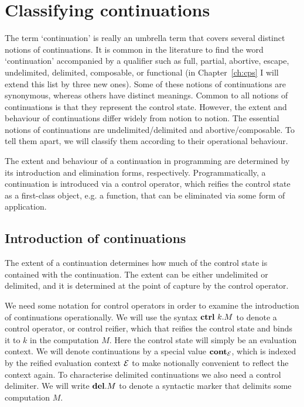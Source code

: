 \documentclass[12pt,phd,lfcs,twoside,openright,logo,leftchapter,normalheadings]{infthesis}
\theoremstyle{plain}
\theoremstyle{definition}
\begin{document}
\section{Classifying continuations}
\label{sec:classifying-continuations}

The term `continuation' is really an umbrella term that covers several
distinct notions of continuations. It is common in the literature to
find the word `continuation' accompanied by a qualifier such as full,
partial, abortive, escape, undelimited, delimited, composable, or
functional (in Chapter~\ref{ch:cps} I will extend this list by three
new ones). Some of these notions of continuations are synonymous,
whereas others have distinct meanings. Common to all notions of
continuations is that they represent the control state. However, the
extent and behaviour of continuations differ widely from notion to
notion. The essential notions of continuations are
undelimited/delimited and abortive/composable. To tell them apart, we
will classify them according to their operational behaviour.

The extent and behaviour of a continuation in programming are
determined by its introduction and elimination forms,
respectively. Programmatically, a continuation is introduced via a
control operator, which reifies the control state as a first-class
object, e.g. a function, that can be eliminated via some form of
application.

\subsection{Introduction of continuations}
%
The extent of a continuation determines how much of the control state
is contained with the continuation.
%
The extent can be either undelimited or delimited, and it is
determined at the point of capture by the control operator.
%

We need some notation for control operators in order to examine the
introduction of continuations operationally. We will use the syntax
$\mathbf{ctrl}~k.M$ to denote a control operator, or control reifier, which that
reifies the control state and binds it to $k$ in the computation
$M$. Here the control state will simply be an evaluation context. We
will denote continuations by a special value $\mathbf{cont}_{\mathcal{E}}$, which is
indexed by the reified evaluation context $\mathcal{E}$ to make notionally
convenient to reflect the context again. To characterise delimited
continuations we also need a control delimiter. We will write
$\mathbf{del}.M$ to denote a syntactic marker that delimits some
computation $M$.
\end{document}
